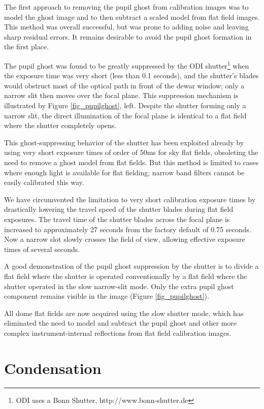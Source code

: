 \documentclass[]{spieman}
\begin{document}
The first approach to removing the pupil ghost from calibration images was to
model the ghost image and to then subtract a scaled model from flat field
images. This method was overall successful, but was prone to adding noise and
leaving sharp residual errors. It remains desirable to avoid the pupil ghost
formation in the first place.

The pupil ghost was found to be greatly suppressed by the ODI
shutter\footnote{ODI uses a Bonn Shutter, http://www.bonn-shutter.de} when the
exposure time was very short (less than 0.1 seconds), and the shutter's blades
would obstruct most of the optical path in front of the dewar window; only a
narrow slit then moves  over the focal plane. This suppression mechanism is
illustrated by Figure \ref{fig_pupilghost}, left. Despite the shutter forming
only a narrow slit, the direct illumination of the focal plane is identical to a
flat field where the shutter completely opens.

This ghost-suppressing behavior of the shutter has been exploited already by
using very short exposure times of order of 50ms for sky flat fields, obsoleting
the need to remove a ghost model from flat fields. But this method is limited to
cases where enough light is available for flat fielding; narrow band filters
cannot be easily calibrated this way.

We have circumvented the limitation to very short calibration exposure times by
drastically lowering the travel speed of the shutter blades during flat field exposures.
The travel time of
the shutter blades across the focal plane is increased to approximately  27
seconds from the factory default of 0.75 seconds.  Now a narrow slot slowly
crosses the field of view, allowing effective exposure times of several seconds.

A good demonstration of the pupil ghost suppression by the shutter is to divide
a flat field where the shutter is operated conventionally by a flat field where
the shutter  operated in the slow narrow-slit mode. Only the extra pupil
ghost component remains visible in the image (Figure \ref{fig_pupilghost}).

All dome flat fields are now acquired using the slow shutter mode, which has
eliminated the need to model and subtract the pupil ghost and other more complex
instrument-internal reflections from flat field calibration images.

\section{Condensation}
\end{document}
